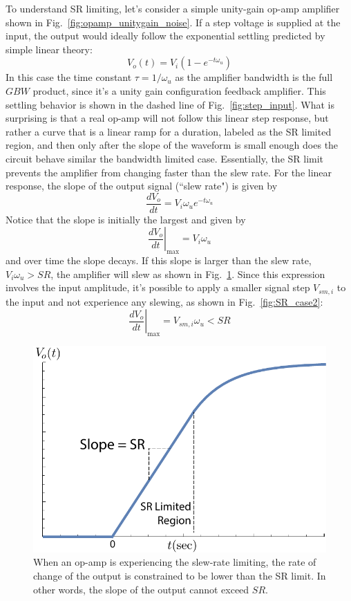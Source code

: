 To understand SR limiting, let's consider a simple unity-gain op-amp amplifier shown in Fig.~\ref{fig:opamp_unitygain_noise}.  If a step voltage is supplied at the input, the output would ideally  follow the exponential settling predicted by simple linear theory:
\begin{equation}
	V_o(t) = V_i \left( 1 - e^{-t \omega_u} \right) 
\end{equation}
In this case the time constant $\tau = 1/\omega_u$ as the amplifier bandwidth is the full $GBW$ product, since it's a unity gain configuration feedback amplifier.  This settling behavior is shown in the dashed line of Fig.~\ref{fig:step_input}.  What is surprising is that a real op-amp will not follow this linear step response, but rather a curve that is a linear ramp for a duration, labeled as the SR limited region, and then only after the slope of the waveform is small enough does the circuit behave similar the bandwidth limited case.  Essentially, the SR limit prevents the amplifier from changing faster than the slew rate.  For the linear response, the  slope of the output signal (``slew rate") is given by
\begin{equation}
	\frac{dV_{o}}{dt} = V_i \omega_u e^{-t \omega_u}
\end{equation}
Notice that the slope is initially the largest and given by
\begin{equation}
	\left. \frac{dV_{o}}{dt} \right|_{\text{max}} = V_i \omega_u
\end{equation}
and over time the slope decays. If this slope is larger than the slew rate, $V_i \omega_u > SR$, the amplifier will slew as shown in Fig.~\ref{fig:SR_case1}.  Since this expression involves the input amplitude, it's possible to apply a smaller signal step $V_{sm,i}$ to the input and not experience any slewing, as shown in Fig.~\ref{fig:SR_case2}:  
\begin{equation}
	\left. \frac{dV_{o}}{dt} \right|_{\text{max}} = V_{sm,i} \omega_u  < SR
\end{equation}
\begin{figure}[tb]
\begin{center}
\includegraphics[width=.65\columnwidth]{SR_case1}
\end{center}
\caption{When an op-amp is experiencing the slew-rate limiting, the rate of change of the output is constrained to be lower than the SR limit.  In other words, the slope of the output cannot exceed $SR$.} \label{fig:SR_case1}
\end{figure} 
